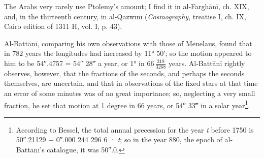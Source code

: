 \documentclass[11pt]{article}
\begin{document}
\par The Arabs very rarely use Ptolemy's amount; I find it in al-Farghānī, ch. XIX, and, in the thirteenth century, in al-Qazwīnī (\emph{Cosmography}, treatise I, ch. IX, Cairo edition of 1311 H, vol. I, p. 43).\par
\par Al-Battānī, comparing his own observations with those of Menelaus, found that in 782 years the longitudes had increased by 11° 50′; so the motion appeared to him to be 54″.4757 = 54″ 28‴ a year, or 1° in $66\,\tfrac{318}{3268}$ years. Al-Battānī rightly observes, however, that the fractions of the seconds, and perhaps the seconds themselves, are uncertain, and that in observations of the fixed stars at that time an error of some minutes was of no great importance; so, neglecting a very small fraction, he set that motion at 1 degree in 66 years, or 54″ 33‴ in a solar year\footnote{According to Bessel, the total annual precession for the year \emph{t} before 1750 is 50″.21129 − 0″.000 244 296 6 · \emph{t}; so in the year 880, the epoch of al-Battānī's catalogue, it was 50″.0.}.\par
\end{document}
